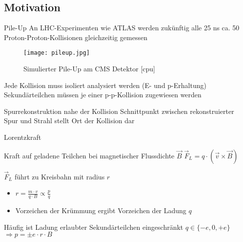 
\subsection{Motivation}


\begin{frame}{Pile-Up}
	An LHC-Experimenten wie ATLAS werden zukünftig alle 25 ns ca. 50
	Proton-Proton-Kollisionen gleichzeitig gemessen
	
	\begin{figure}[htp]
	\begin{center}
	  \texttt{[image: pileup.jpg]}
	  \caption{Simulierter Pile-Up am CMS Detektor [cpu]}
	\end{center}
	\end{figure}
	\vspace{-0.7cm}
	
	\begin{block}{Jede Kollision muss isoliert analysiert werden (E- und
	p-Erhaltung)} Sekundärteilchen müssen je einer p-p-Kollision zugewiesen werden 
	\end{block}
	
	\begin{exampleblock}{Spurrekonstruktion nahe der Kollision}
		Schnittpunkt zwischen rekonstruierter Spur und Strahl stellt Ort der Kollision
		dar
	\end{exampleblock}
\end{frame}



\begin{frame}{Lorentzkraft}
	\begin{block}{Kraft auf geladene Teilchen bei magnetischer Flussdichte
	$\vec{B}$}
		$\vec{F}_L = q \cdot (\vec{v} \times \vec{B})$
	\end{block}

	\begin{block}{$\vec{F}_L$ führt zu Kreisbahn mit radius $r$}
		\begin{itemize}\setlength{\itemsep}{+5pt}
		  \item $r = \frac{m \cdot v}{q \cdot B} \propto \frac{p}{q}$
		  \item Vorzeichen der Krümmung ergibt Vorzeichen der Ladung $q$
		\end{itemize}
	\end{block}
	\begin{exampleblock}{Häufig ist Ladung erlaubter Sekundärteilchen eingeschränkt}
		$q \in \{- e, 0, +e\}$
		$\Rightarrow p = \pm e \cdot r \cdot B$
	\end{exampleblock}
\end{frame}